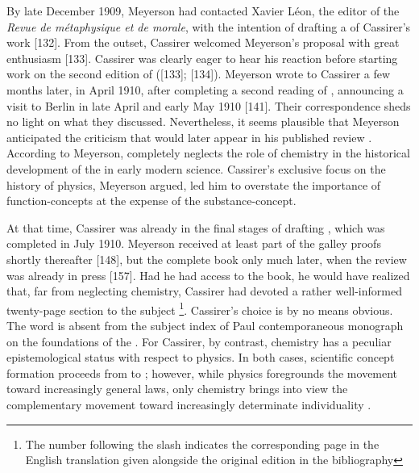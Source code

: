 \documentclass[submitted,12pt]{article}
\begin{document}

By late December 1909, Meyerson had contacted Xavier Léon, the editor of the \emph{Revue de métaphysique et de morale}, with the intention of drafting a  of Cassirer’s work [132]. From the outset, Cassirer welcomed Meyerson’s proposal with great enthusiasm [133]. Cassirer was clearly eager to hear his reaction before starting work on the second edition of \EPt  ([133]; [134]). Meyerson wrote to Cassirer a few months later, in April 1910, after completing a second reading of \EPt, announcing a visit to Berlin in late April and early May 1910 [141]. Their correspondence sheds no light on what they discussed. Nevertheless, it seems plausible that Meyerson anticipated the criticism that would later appear in his published review \citep{Meyerson1911}. According to Meyerson, \EPt completely neglects the role of chemistry in the historical development of the  in early modern science. Cassirer's exclusive focus on the history of physics, Meyerson argued, led him to overstate the importance of function-concepts at the expense of the substance-concept.

At that time, Cassirer was already in the final stages of drafting \SFt \citep{Cassirer1910}, which was completed in July 1910. Meyerson received at least part of the galley proofs shortly thereafter [148], but the complete book only much later, when the review was already in press [157]. Had he had access to the book, he would have realized that, far from neglecting chemistry, Cassirer had devoted a rather well-informed twenty-page section to the subject \footnote{The number following the slash indicates the corresponding page in the English translation given alongside the original edition in the bibliography}. Cassirer's choice is by no means obvious. The word  is absent from the subject index of Paul  contemporaneous  monograph on the foundations of the . For Cassirer, by contrast, chemistry has a peculiar epistemological status with respect to physics. In both cases, scientific concept formation proceeds from \SCs to \FCs; however, while physics foregrounds the movement toward increasingly general laws, only chemistry brings into view the complementary movement toward increasingly determinate individuality \citep[270--72/203--5; 289--93/217--21]{Cassirer1910}.   
\end{document}
